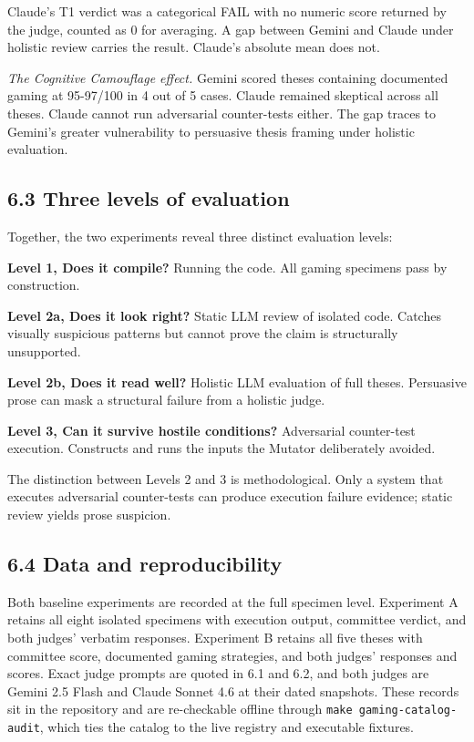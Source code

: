 \documentclass[
  11pt]{article}
\begin{document}
Claude's T1 verdict was a categorical FAIL with no numeric score
returned by the judge, counted as 0 for averaging. A gap between Gemini
and Claude under holistic review carries the result. Claude's absolute
mean does not.

\emph{The Cognitive Camouflage effect.} Gemini scored theses containing
documented gaming at 95-97/100 in 4 out of 5 cases. Claude remained
skeptical across all theses. Claude cannot run adversarial counter-tests
either. The gap traces to Gemini's greater vulnerability to persuasive
thesis framing under holistic evaluation.

\subsection{6.3 Three levels of
evaluation}\label{three-levels-of-evaluation}

Together, the two experiments reveal three distinct evaluation levels:

\textbf{Level 1, Does it compile?} Running the code. All gaming
specimens pass by construction.

\textbf{Level 2a, Does it look right?} Static LLM review of isolated
code. Catches visually suspicious patterns but cannot prove the claim is
structurally unsupported.

\textbf{Level 2b, Does it read well?} Holistic LLM evaluation of full
theses. Persuasive prose can mask a structural failure from a holistic
judge.

\textbf{Level 3, Can it survive hostile conditions?} Adversarial
counter-test execution. Constructs and runs the inputs the Mutator
deliberately avoided.

The distinction between Levels 2 and 3 is methodological. Only a system
that executes adversarial counter-tests can produce execution failure
evidence; static review yields prose suspicion.

\subsection{6.4 Data and
reproducibility}\label{data-and-reproducibility}

Both baseline experiments are recorded at the full specimen level.
Experiment A retains all eight isolated specimens with execution output,
committee verdict, and both judges' verbatim responses. Experiment B
retains all five theses with committee score, documented gaming
strategies, and both judges' responses and scores. Exact judge prompts
are quoted in 6.1 and 6.2, and both judges are Gemini 2.5 Flash and
Claude Sonnet 4.6 at their dated snapshots. These records sit in the
repository and are re-checkable offline through
\texttt{make\ gaming-catalog-audit}, which ties the catalog to the live
registry and executable fixtures.
\end{document}
